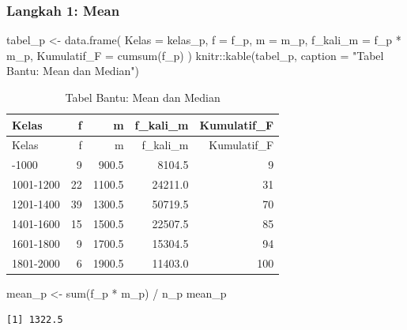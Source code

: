 \documentclass[
  indonesian,
  letterpaper,
]{book}
\newenvironment{Shaded}{\begin{snugshade}}{\end{snugshade}}
\newcommand{\AttributeTok}[1]{\textcolor[rgb]{0.40,0.45,0.13}{#1}}
\newcommand{\FunctionTok}[1]{\textcolor[rgb]{0.28,0.35,0.67}{#1}}
\newcommand{\NormalTok}[1]{\textcolor[rgb]{0.00,0.23,0.31}{#1}}
\newcommand{\OtherTok}[1]{\textcolor[rgb]{0.00,0.23,0.31}{#1}}
\newcommand{\SpecialCharTok}[1]{\textcolor[rgb]{0.37,0.37,0.37}{#1}}
\newcommand{\StringTok}[1]{\textcolor[rgb]{0.13,0.47,0.30}{#1}}
\begin{document}
\subsubsection{Langkah 1: Mean}\label{langkah-1-mean}

\begin{Shaded}
\begin{Highlighting}[]
\NormalTok{tabel\_p }\OtherTok{\textless{}{-}} \FunctionTok{data.frame}\NormalTok{(}
\AttributeTok{Kelas =}\NormalTok{ kelas\_p,}
\AttributeTok{f =}\NormalTok{ f\_p,}
\AttributeTok{m =}\NormalTok{ m\_p,}
\AttributeTok{f\_kali\_m =}\NormalTok{ f\_p }\SpecialCharTok{*}\NormalTok{ m\_p,}
\AttributeTok{Kumulatif\_F =} \FunctionTok{cumsum}\NormalTok{(f\_p)}
\NormalTok{)}
\NormalTok{knitr}\SpecialCharTok{::}\FunctionTok{kable}\NormalTok{(tabel\_p, }\AttributeTok{caption =} \StringTok{"Tabel Bantu: Mean dan Median"}\NormalTok{)}
\end{Highlighting}
\end{Shaded}

\begin{longtable}[]{@{}lrrrr@{}}
\caption{Tabel Bantu: Mean dan Median}\tabularnewline
\toprule\noalign{}
Kelas & f & m & f\_kali\_m & Kumulatif\_F \\
\midrule\noalign{}
\endfirsthead
\toprule\noalign{}
Kelas & f & m & f\_kali\_m & Kumulatif\_F \\
\midrule\noalign{}
\endhead
\bottomrule\noalign{}
\endlastfoot
801-1000 & 9 & 900.5 & 8104.5 & 9 \\
1001-1200 & 22 & 1100.5 & 24211.0 & 31 \\
1201-1400 & 39 & 1300.5 & 50719.5 & 70 \\
1401-1600 & 15 & 1500.5 & 22507.5 & 85 \\
1601-1800 & 9 & 1700.5 & 15304.5 & 94 \\
1801-2000 & 6 & 1900.5 & 11403.0 & 100 \\
\end{longtable}

\begin{Shaded}
\begin{Highlighting}[]
\NormalTok{mean\_p }\OtherTok{\textless{}{-}} \FunctionTok{sum}\NormalTok{(f\_p }\SpecialCharTok{*}\NormalTok{ m\_p) }\SpecialCharTok{/}\NormalTok{ n\_p}
\NormalTok{mean\_p}
\end{Highlighting}
\end{Shaded}

\begin{verbatim}
[1] 1322.5
\end{verbatim}
\end{document}
